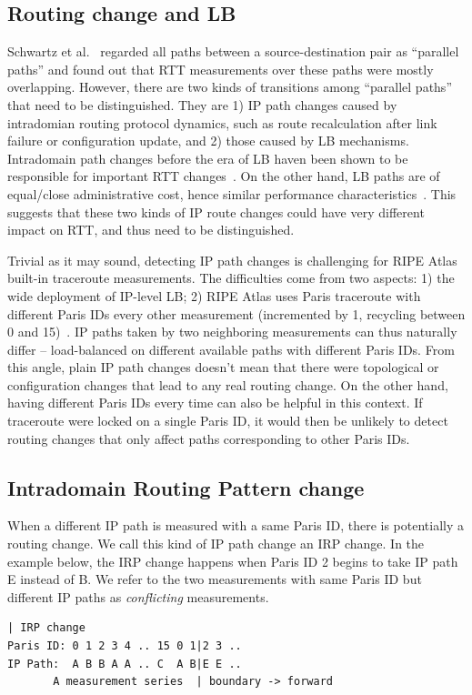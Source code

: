 \subsection{Routing change and \acf{LB}}

Schwartz et al.~\cite{Schwartz2010} regarded all paths between a source-destination pair as ``parallel paths'' and found out that RTT measurements over these paths were mostly overlapping.
However, there are two kinds of transitions among ``parallel paths'' that need to be distinguished.
They are 1) IP path changes caused by intradomian routing protocol dynamics, such as route recalculation after link failure or configuration update, 
and 2) those caused by LB mechanisms. 
Intradomain path changes before the era of LB haven been shown to be responsible for important RTT changes~\cite{Pucha2007}. 
On the other hand, LB paths are of equal/close administrative cost, hence similar performance characteristics~\cite{Augustin2011}.
This suggests that these two kinds of IP route changes could have very different impact on RTT, and thus need to be distinguished.
 
Trivial as it may sound, detecting IP path changes is challenging for RIPE Atlas built-in traceroute measurements.
The difficulties come from two aspects: 1) the wide deployment of IP-level LB; 2) RIPE Atlas uses Paris traceroute with different Paris IDs every other measurement (incremented by 1, recycling between 0 and 15)~\cite{Augustin2006, Pelsser2013}.
IP paths taken by two neighboring measurements can thus naturally differ -- 
load-balanced on different available paths with different Paris IDs.  
From this angle, plain IP path changes doesn't mean that there were topological or configuration changes that lead to any real routing change. 
On the other hand, having different Paris IDs every time can also be helpful in this context.  If traceroute were locked on a single Paris ID, it would then be unlikely to detect routing changes that only affect paths corresponding to other Paris IDs.

\subsection{Intradomain Routing Pattern change}
When a different IP path is measured with a same Paris ID,
there is potentially a routing change. 
We call this kind of IP path change an \acf{IRP} change.
In the example below, the IRP change happens when Paris ID 2 begins to take IP path E instead of B. We refer to the two measurements with same Paris ID but different IP paths as \textit{conflicting} measurements.
\begin{Verbatim}[fontsize=\small]
                             | IRP change
Paris ID: 0 1 2 3 4 .. 15 0 1|2 3 ..
IP Path:  A B B A A .. C  A B|E E ..
       A measurement series  | boundary -> forward
\end{Verbatim}

